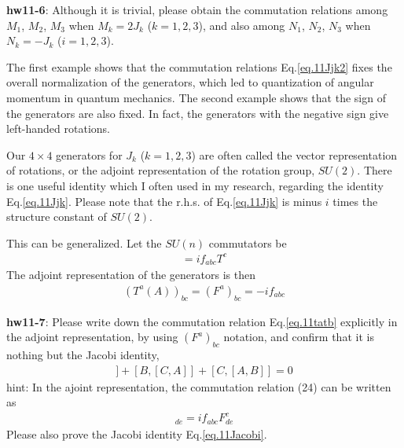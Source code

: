 \documentclass[12pt]{article}
\begin{document}
{\bf hw11-6}: Although it is trivial, please obtain the commutation relations
  among $M_1$, $M_2$, $M_3$ when $M_k=2J_k$ ($k=1,2,3$), and also among
  $N_1$, $N_2$, $N_3$ when $N_k = -J_k$ ($i=1,2,3$).

  The first example shows that the commutation relations Eq.\ref{eq.11Jjk2} fixes the
  overall normalization of the generators, which led to quantization
  of angular momentum in quantum mechanics.  The second example shows
  that the sign of the generators are also fixed. In fact, the
  generators with the negative sign give left-handed rotations.

  Our $4 \times 4$ generators for $J_k$ ($k=1,2,3$) are often called the vector
  representation of rotations, or the adjoint representation of the
  rotation group, $SU(2)$. There is one useful identity which I often
  used in my research, regarding the identity Eq.\ref{eq.11Jjk}.  Please note that
  the r.h.s. of Eq.\ref{eq.11Jjk} is minus $i$ times the structure constant of $SU(2)$.

  This can be generalized.  Let the $SU(n)$ commutators be
\begin{eqnarray}
  [ T^a, T^b ] = i f_{abc} T^c \label{eq.11tatb}
\end{eqnarray}
  The adjoint representation of the generators is then
\begin{eqnarray}
  (T^a(A))_{bc} = (F^a)_{bc} = -i f_{abc}
\end{eqnarray}

{\bf hw11-7}: Please write down the commutation relation Eq.\ref{eq.11tatb} explicitly in
  the adjoint representation, by using $(F^a)_{bc}$ notation, and confirm
  that it is nothing but the Jacobi identity,
\begin{eqnarray}
  [A,[B,C]] + [B,[C,A]] + [C,[A,B]] = 0 \label{eq.11Jacobi}
\end{eqnarray}
hint: In the ajoint representation, the commutation relation (24) can
  be written as
\begin{eqnarray}
  [ F^a, F^b ]_{de} = i f_{abc} F^c_{de}
\end{eqnarray}
  Please also prove the Jacobi identity Eq.\ref{eq.11Jacobi}.
\end{document}
